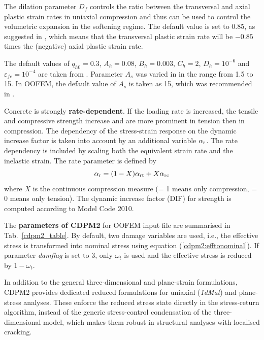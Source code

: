 \documentclass[a4paper]{article}
\begin{document}
The dilation parameter $D_f$ controls the ratio between the transversal
and axial plastic strain rates in uniaxial compression and thus can
be used to control the volumetric expansion in the softening regime.
The default value is set to 0.85, as suggested in \cite{GraJir},
which means that the transversal plastic strain rate will be $-0.85$ times the (negative) axial plastic strain rate. 

The default values of $q_{h0}=0.3$, $A_h=0.08$, $B_h=0.003$, $C_h=2$, $D_h=10^{-6}$
and $\varepsilon_{fc}=10^{-4}$ are taken from \cite{GraXenNys13}.
Parameter $A_s$ was varied in \cite{GraXenNys13}
in the range from 1.5 to 15. In OOFEM, the default value of $A_s$ is taken as 15, which was recommended in \cite{GraJir}.

Concrete is strongly {\bf rate-dependent}. If the loading rate is increased, the tensile and compressive strength increase and are more prominent in tension then in compression. The dependency of the stress-strain response on the dynamic increase factor is taken into account by an additional variable $\alpha_{\rm r}$. The rate dependency is included by scaling both the equivalent strain rate and the inelastic strain. The rate parameter is defined by
\begin{equation}
\alpha_{\rm r}=(1-X) \alpha_{\rm rt} + X  \alpha_{\rm rc}
\end{equation}
where $X$ is the continuous compression measure (= 1 means only compression, = 0 means only tension).
The dynamic increase factor (DIF) for strength is computed according to Model Code 2010.  

The {\bf parameters of CDPM2} for OOFEM input file are summarised in Tab.~\ref{cdpm2_table}.
By default, two damage variables are used, i.e., the effective stress is transformed into
nominal stress using equation (\ref{cdpm2:efftonominal}). If parameter {\em damflag} is set to 3,
only $\omega_t$ is used and the effective stress is reduced by $1-\omega_t$.

In addition to the general three-dimensional and plane-strain formulations, CDPM2 provides
dedicated reduced formulations for uniaxial ({\em 1dMat}) and plane-stress analyses. These enforce
the reduced stress state directly in the stress-return algorithm, instead of the generic
stress-control condensation of the three-dimensional model, which makes them robust in
structural analyses with localised cracking.
\end{document}
